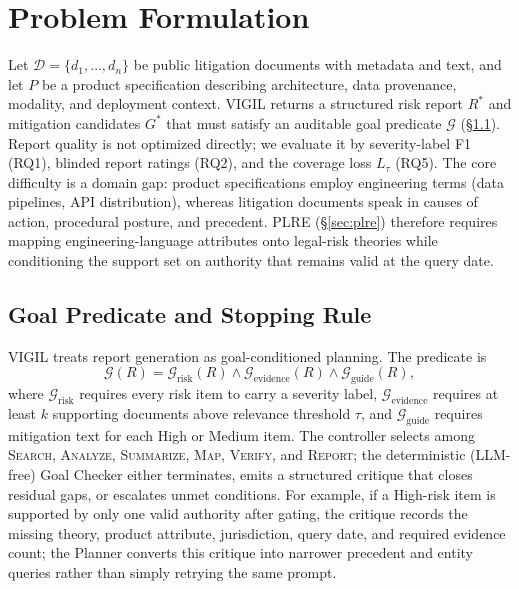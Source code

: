 \section{Problem Formulation}
\label{sec:formulation}

Let $\mathcal{D}=\{d_1,\ldots,d_n\}$ be public litigation documents with metadata and text, and let $P$ be a product specification describing architecture, data provenance, modality, and deployment context. VIGIL returns a structured risk report $R^*$ and mitigation candidates $G^*$ that must satisfy an auditable goal predicate $\mathcal{G}$ (\S\ref{sec:goal_checker}). Report quality is not optimized directly; we evaluate it by severity-label F1 (RQ1), blinded report ratings (RQ2), and the coverage loss $L_\tau$ (RQ5). The core difficulty is a domain gap: product specifications employ engineering terms (data pipelines, API distribution), whereas litigation documents speak in causes of action, procedural posture, and precedent. PLRE (\S\ref{sec:plre}) therefore requires mapping engineering-language attributes onto legal-risk theories while conditioning the support set on authority that remains valid at the query date.

\subsection{Goal Predicate and Stopping Rule}
\label{sec:goal_checker}

VIGIL treats report generation as goal-conditioned planning. The predicate is
\begin{equation}
\label{eq:goal_predicate}
  \mathcal{G}(R)=\mathcal{G}_{\text{risk}}(R)\wedge\mathcal{G}_{\text{evidence}}(R)\wedge\mathcal{G}_{\text{guide}}(R),
\end{equation}
where $\mathcal{G}_{\text{risk}}$ requires every risk item to carry a severity label, $\mathcal{G}_{\text{evidence}}$ requires at least $k$ supporting documents above relevance threshold $\tau$, and $\mathcal{G}_{\text{guide}}$ requires mitigation text for each High or Medium item. The controller selects among \textsc{Search}, \textsc{Analyze}, \textsc{Summarize}, \textsc{Map}, \textsc{Verify}, and \textsc{Report}; the deterministic (LLM-free) Goal Checker either terminates, emits a structured critique that closes residual gaps, or escalates unmet conditions. For example, if a High-risk item is supported by only one valid authority after gating, the critique records the missing theory, product attribute, jurisdiction, query date, and required evidence count; the Planner converts this critique into narrower precedent and entity queries rather than simply retrying the same prompt.

